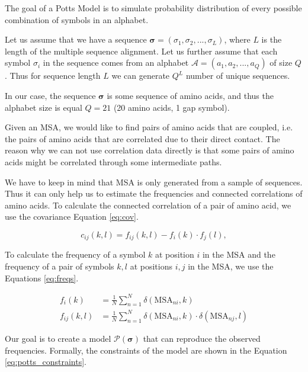The goal of a Potts Model is to simulate probability distribution of every possible combination of symbols in an alphabet.

Let us assume that we have a sequence $\boldsymbol{\sigma} = (\sigma_1, \sigma_2, ..., \sigma_L)$, where $L$ is the length of the multiple sequence alignment. 
Let us further assume that each symbol $\sigma_i$ in the sequence comes from an alphabet $\mathcal{A} = (a_1, a_2, ..., a_Q)$ of size $Q$. 
Thus for sequence length $L$ we can generate $Q^L$ number of unique sequences.
    
In our case, the sequence $\boldsymbol{\sigma}$ is some sequence of amino acids, and thus the alphabet size is equal $Q = 21$ (20 amino acids, 1 gap symbol).
        
Given an MSA, we would like to find pairs of amino acids that are coupled, i.e. the pairs of amino acids that are correlated due to their direct contact. 
The reason why we can not use correlation data directly is that some pairs of amino acids might be correlated through some intermediate paths.
        
We have to keep in mind that MSA is only generated from a sample of sequences.
Thus it can only help us to estimate the frequencies and connected correlations of amino acids. 
To calculate the connected correlation of a pair of amino acid, we use the covariance Equation \ref{eq:cov}.

\begin{equation}
    c_{ij}(k, l) = f_{ij}(k, l) - f_{i}(k) \cdot f_{j}(l),
    \label{eq:cov}
\end{equation}

To calculate the frequency of a symbol $k$ at position $i$ in the MSA and the frequency of a pair of symbols $k, l$ at positions $i, j$ in the MSA, we use the Equations \ref{eq:freqs}.

\begin{equation}
    \begin{split}
        f_{i}(k)     &= \frac{1}{N} \sum_{n = 1}^N \delta(\text{MSA}_{ni}, k) \\    
        f_{ij}(k, l) &= \frac{1}{N} \sum_{n = 1}^N \delta(\text{MSA}_{ni}, k) \cdot \delta(\text{MSA}_{nj}, l)
        \label{eq:freqs}
    \end{split}
\end{equation}

Our goal is to create a model $\mathcal{P(\bm{\sigma})}$ that can reproduce the observed frequencies. 
Formally, the constraints of the model are shown in the Equation \ref{eq:potts_constraints}.
        
